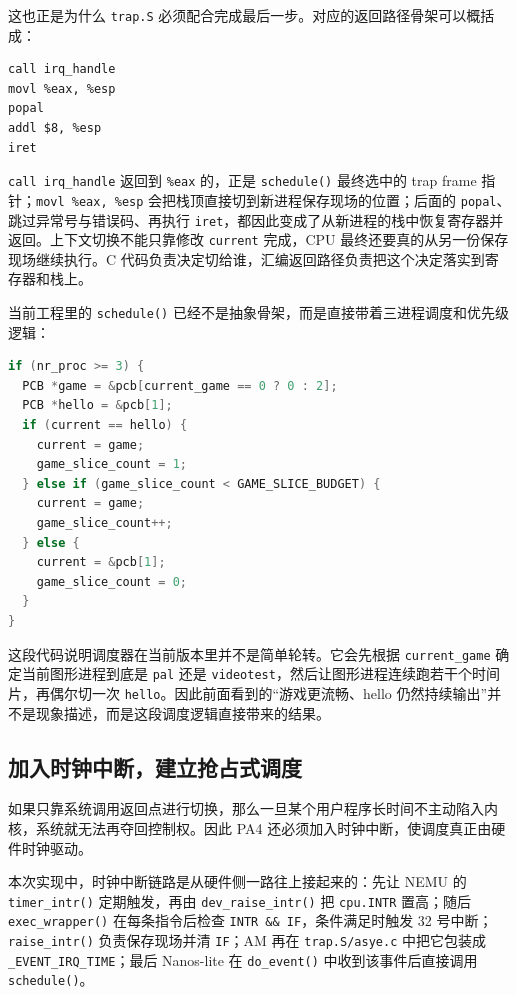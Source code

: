 \documentclass[a4paper]{article}
\begin{document}
这也正是为什么 \texttt{trap.S} 必须配合完成最后一步。对应的返回路径骨架可以概括成：
\begin{lstlisting}[language={[x86masm]Assembler}]
call irq_handle
movl %eax, %esp
popal
addl $8, %esp
iret
\end{lstlisting}

\texttt{call irq\_handle} 返回到 \texttt{\%eax} 的，正是 \texttt{schedule()} 最终选中的 trap frame 指针；\texttt{movl \%eax, \%esp} 会把栈顶直接切到新进程保存现场的位置；后面的 \texttt{popal}、跳过异常号与错误码、再执行 \texttt{iret}，都因此变成了从新进程的栈中恢复寄存器并返回。上下文切换不能只靠修改 \texttt{current} 完成，CPU 最终还要真的从另一份保存现场继续执行。C 代码负责决定切给谁，汇编返回路径负责把这个决定落实到寄存器和栈上。

当前工程里的 \texttt{schedule()} 已经不是抽象骨架，而是直接带着三进程调度和优先级逻辑：
\begin{lstlisting}[language=C]
if (nr_proc >= 3) {
  PCB *game = &pcb[current_game == 0 ? 0 : 2];
  PCB *hello = &pcb[1];
  if (current == hello) {
    current = game;
    game_slice_count = 1;
  } else if (game_slice_count < GAME_SLICE_BUDGET) {
    current = game;
    game_slice_count++;
  } else {
    current = &pcb[1];
    game_slice_count = 0;
  }
}
\end{lstlisting}

这段代码说明调度器在当前版本里并不是简单轮转。它会先根据 \texttt{current\_game} 确定当前图形进程到底是 \texttt{pal} 还是 \texttt{videotest}，然后让图形进程连续跑若干个时间片，再偶尔切一次 \texttt{hello}。因此前面看到的“游戏更流畅、hello 仍然持续输出”并不是现象描述，而是这段调度逻辑直接带来的结果。

\subsection{加入时钟中断，建立抢占式调度}
如果只靠系统调用返回点进行切换，那么一旦某个用户程序长时间不主动陷入内核，系统就无法再夺回控制权。因此 PA4 还必须加入时钟中断，使调度真正由硬件时钟驱动。

本次实现中，时钟中断链路是从硬件侧一路往上接起来的：先让 NEMU 的 \texttt{timer\_intr()} 定期触发，再由 \texttt{dev\_raise\_intr()} 把 \texttt{cpu.INTR} 置高；随后 \texttt{exec\_wrapper()} 在每条指令后检查 \texttt{INTR \&\& IF}，条件满足时触发 32 号中断；\texttt{raise\_intr()} 负责保存现场并清 \texttt{IF}；AM 再在 \texttt{trap.S/asye.c} 中把它包装成 \texttt{\_EVENT\_IRQ\_TIME}；最后 Nanos-lite 在 \texttt{do\_event()} 中收到该事件后直接调用 \texttt{schedule()}。
\end{document}
